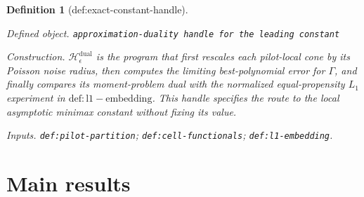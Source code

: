 \documentclass{article}
\newtheorem{definition}{Definition}
\begin{document}
\begin{definition}[def:exact-constant-handle]\label{def:exact-constant-handle}
\par\smallskip\noindent\emph{Defined object.} \texttt{approximation-\allowbreak{}duality handle for the leading constant}
\par\smallskip\noindent\emph{Construction.} \(\mathscr H_\epsilon^{\mathrm{dual}}\) is the program that first rescales each pilot-local cone by its Poisson noise radius, then computes the limiting best-polynomial error for \(\Gamma\), and finally compares its moment-problem dual with the normalized equal-propensity \(L_1\) experiment in \(\mathrm{def:l1-embedding}\). This handle specifies the route to the local asymptotic minimax constant without fixing its value.
\par\smallskip\noindent\emph{Inputs.} \texttt{def:\allowbreak{}pilot-\allowbreak{}partition}; \texttt{def:\allowbreak{}cell-\allowbreak{}functionals}; \texttt{def:\allowbreak{}l1-\allowbreak{}embedding}.
\end{definition}

\section{Main results}
\end{document}
